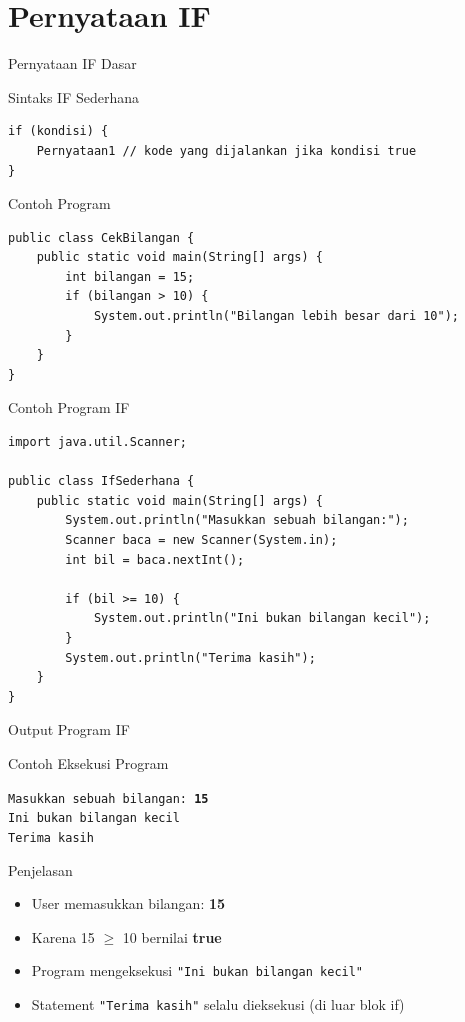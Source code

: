 \documentclass{beamer}
\begin{document}
\section{Pernyataan IF}
\begin{frame}[fragile]{Pernyataan IF Dasar}
  \begin{block}{Sintaks IF Sederhana}
    \begin{lstlisting}
if (kondisi) {
    Pernyataan1 // kode yang dijalankan jika kondisi true
}
    \end{lstlisting}
  \end{block}
  
  \begin{exampleblock}{Contoh Program}
    \begin{lstlisting}
public class CekBilangan {
    public static void main(String[] args) {
        int bilangan = 15;
        if (bilangan > 10) {
            System.out.println("Bilangan lebih besar dari 10");
        }
    }
}\end{lstlisting}
  \end{exampleblock}
\end{frame}

\begin{frame}[fragile]{Contoh Program IF}
\begin{lstlisting}
import java.util.Scanner;

public class IfSederhana {
    public static void main(String[] args) {
        System.out.println("Masukkan sebuah bilangan:");
        Scanner baca = new Scanner(System.in);
        int bil = baca.nextInt();
        
        if (bil >= 10) {
            System.out.println("Ini bukan bilangan kecil");
        }
        System.out.println("Terima kasih");
    }
}
\end{lstlisting}
\end{frame}

\begin{frame}[fragile]{Output Program IF}
\begin{block}{Contoh Eksekusi Program}
\colorbox{gray!20}{
    \parbox{0.9\textwidth}{
        \texttt{Masukkan sebuah bilangan: \textbf{15}\\
        Ini bukan bilangan kecil\\
        Terima kasih}
    }
}
\end{block}

\begin{block}{Penjelasan}
\begin{itemize}
\item User memasukkan bilangan: \textbf{15}
\item Karena 15 $\geq$ 10 bernilai \textbf{true}
\item Program mengeksekusi \texttt{"Ini bukan bilangan kecil"}
\item Statement \texttt{"Terima kasih"} selalu dieksekusi (di luar blok if)
\end{itemize}
\end{block}
\end{frame}
\end{document}
